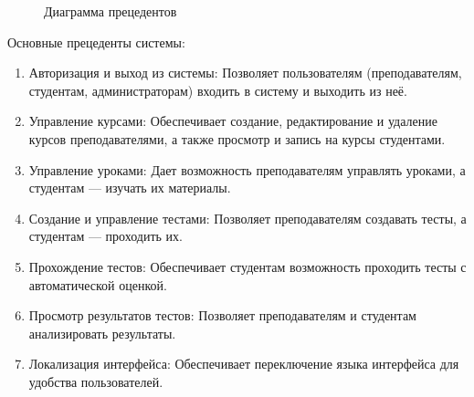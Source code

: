 \begin{figure}[ht]
	\caption{Диаграмма прецедентов}
	\label{comp:image}
\end{figure}

Основные прецеденты системы:

\begin{enumerate}
	\item {Авторизация и выход из системы}: Позволяет пользователям (преподавателям, студентам, администраторам) входить в систему и выходить из неё.
	\item {Управление курсами}: Обеспечивает создание, редактирование и удаление курсов преподавателями, а также просмотр и запись на курсы студентами.
	\item {Управление уроками}: Дает возможность преподавателям управлять уроками, а студентам --- изучать их материалы.
	\item {Создание и управление тестами}: Позволяет преподавателям создавать тесты, а студентам --- проходить их.
	\item {Прохождение тестов}: Обеспечивает студентам возможность проходить тесты с автоматической оценкой.
	\item {Просмотр результатов тестов}: Позволяет преподавателям и студентам анализировать результаты.
	\item {Локализация интерфейса}: Обеспечивает переключение языка интерфейса для удобства пользователей.
\end{enumerate}

